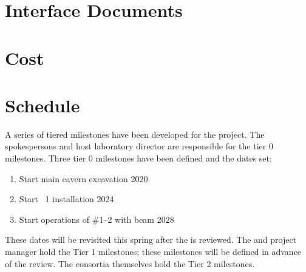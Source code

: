 \section{Interface Documents}
\label{sec:fdsp-coord-interface}



\section{Cost}
\label{sec:fdsp-coord-cost}


\section{Schedule}
\label{sec:fdsp-coord-controls}

A series of tiered milestones have been developed for the 
project. The spokespersons and host laboratory director are
responsible for the tier 0 milestones. Three tier 0 milestones have
been defined and the dates set:
\begin{enumerate}
\item Start main cavern excavation \hspace{2.58in} 2020
\item Start ~1 installation \hspace{2.1in} 2024
\item Start operations of  \#1--2 with beam \hspace{0.8in} 2028
\end{enumerate}
These dates will be revisited this spring after the  is reviewed. The
 and  project manager hold the Tier 1
milestones; these milestones will be defined in advance of the
 review. The consortia themselves hold the Tier 2
milestones.


